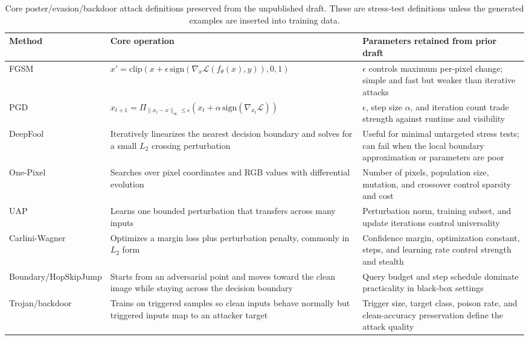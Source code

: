 ﻿\documentclass[6p,10pt,times]{ieeeaccess}
\begin{document}
\begin{table}[t]
\centering
\caption{Core poster/evasion/backdoor attack definitions preserved from the unpublished draft. These are stress-test definitions unless the generated examples are inserted into training data.}
\label{tab:legacyattackdefs}
\small
\begin{tabular}{p{}p{}p{}}
\toprule
Method & Core operation & Parameters retained from prior draft \\
\midrule
FGSM & \(x'=\mathrm{clip}(x+\epsilon\,\mathrm{sign}(\nabla_x\mathcal{L}(f_\theta(x),y)),0,1)\) & \(\epsilon\) controls maximum per-pixel change; simple and fast but weaker than iterative attacks \\
PGD & \(x_{t+1}=\Pi_{\|x_t-x\|_\infty\le\epsilon}(x_t+\alpha\,\mathrm{sign}(\nabla_{x_t}\mathcal{L}))\) & \(\epsilon\), step size \(\alpha\), and iteration count trade strength against runtime and visibility \\
DeepFool & Iteratively linearizes the nearest decision boundary and solves for a small \(L_2\) crossing perturbation & Useful for minimal untargeted stress tests; can fail when the local boundary approximation or parameters are poor \\
One-Pixel & Searches over pixel coordinates and RGB values with differential evolution & Number of pixels, population size, mutation, and crossover control sparsity and cost \\
UAP & Learns one bounded perturbation that transfers across many inputs & Perturbation norm, training subset, and update iterations control universality \\
Carlini-Wagner & Optimizes a margin loss plus perturbation penalty, commonly in \(L_2\) form & Confidence margin, optimization constant, steps, and learning rate control strength and stealth \\
Boundary/HopSkipJump & Starts from an adversarial point and moves toward the clean image while staying across the decision boundary & Query budget and step schedule dominate practicality in black-box settings \\
Trojan/backdoor & Trains on triggered samples so clean inputs behave normally but triggered inputs map to an attacker target & Trigger size, target class, poison rate, and clean-accuracy preservation define the attack quality \\
\bottomrule
\end{tabular}
\end{table}
\end{document}
